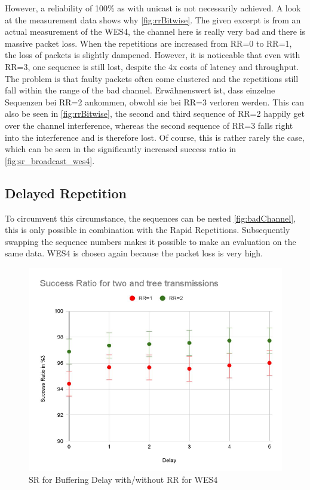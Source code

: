 However, a reliability of 100\% as with unicast is not necessarily achieved.
A look at the measurement data shows why \cref{fig:rrBitwise}.
The given excerpt is from an actual measurement of the WES4, 
the channel here is really very bad and there is massive packet loss.
When the repetitions are increased from RR=0 to RR=1, the loss of packets is slightly dampened.
However, it is noticeable that even with RR=3,
one sequence is still lost, despite the 4x costs of latency and throughput.
The problem is that faulty packets often come clustered 
and the repetitions still fall within the range of the bad channel.
Erwähnenswert ist, dass einzelne Sequenzen bei RR=2 ankommen, obwohl sie bei RR=3 verloren werden.
This can also be seen in \cref{fig:rrBitwise}, the second and third sequence of RR=2 happily get over the channel interference,
whereas the second sequence of RR=3 falls right into the interference and is therefore lost.
Of course, this is rather rarely the case, 
which can be seen in the significantly increased success ratio in \cref{fig:sr_broadcast_wes4}.

\subsection*{Delayed Repetition}

To circumvent this circumstance, the sequences can be nested \cref{fig:badChannel},
this is only possible in combination with the Rapid Repetitions.
Subsequently swapping the sequence numbers makes it possible to make an evaluation on the same data.
WES4 is chosen again because the packet loss is very high.

\begin{figure}[h]
	\centering
	\includegraphics[scale=0.8]{figures/bufferingDelay.pdf}
	\caption{SR for Buffering Delay with/without RR for WES4}
	\label{fig:bufferingDelay}
\end{figure}

